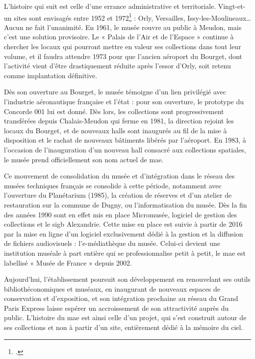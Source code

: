 L’histoire qui suit est celle d’une errance administrative et territoriale. Vingt-et-un sites sont envisagés entre 1952 et 1972\footcite{terrier_eroport_2019} : Orly, Versailles, Issy-les-Moulineaux… Aucun ne fait l’unanimité. En 1961, le musée rouvre au public à Meudon, mais c’est une solution provisoire. Le « Palais de l’Air et de l’Espace » continue à chercher les locaux qui pourront mettre en valeur ses collections dans tout leur volume, et il faudra attendre 1973 pour que l'ancien aéroport du Bourget, dont l'activité vient d'être drastiquement réduite après l’essor d'Orly, soit retenu comme implantation définitive.

Dès son ouverture au Bourget, le musée témoigne d'un lien privilégié avec l'industrie aéronautique française et l'état : pour son ouverture, le prototype du Concorde 001 lui est donné. Dès lors, les collections sont progressivement transférées depuis Chalais-Meudon qui ferme en 1981, la direction rejoint les locaux du Bourget, et de nouveaux halls sont inaugurés au fil de la mise à disposition et le rachat de nouveaux bâtiments libérés par l'aéroport. En 1983, à l'occasion de l'inauguration d'un nouveau hall consacré aux collections spatiales, le musée prend officiellement son nom actuel de \acf{mae}.

Ce mouvement de consolidation du musée et d'intégration dans le réseau des musées techniques français se consolide à cette période, notamment avec l'ouverture du Planétarium (1985), la création de réserves et d'un atelier de restauration sur la commune de Dugny,  ou l'informatisation du musée. Dès la fin des années 1990 sont en effet mis en place Micromusée, logiciel de gestion des collections et le \ac{sigb} Alexandrie. Cette mise en place est suivie à partir de 2016 par la mise en ligne d'un logiciel exclusivement dédié à la gestion et la diffusion de fichiers audiovisuels : l'e-médiathèque du musée. Celui-ci devient une institution muséale à part entière qui se professionnalise petit à petit, le \ac{mae} est labellisé « Musée de France » depuis 2002.

Aujourd’hui, l’établissement poursuit son développement en renouvelant ses outils bibliothéconomiques et muséaux, en inaugurant de nouveaux espaces de conservation et d'exposition, et son intégration prochaine au réseau du Grand Paris Express laisse espérer un accroissement de son attractivité auprès du public. L’histoire du \ac{mae} est ainsi celle d'un projet, qui s’est construit autour de ses collections et non à partir d’un site, entièrement dédié à la mémoire du ciel.

